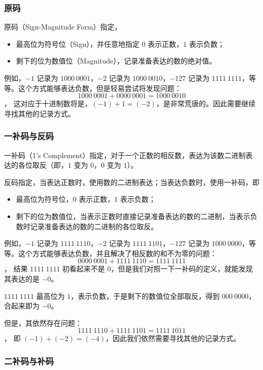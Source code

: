         \subsubsection{原码}\label{subsubsec:ArithBasics/positional-notation-presentation/binary/sign-magnitude}
            原码（Sign-Magnitude Form）指定，
            \begin{itemize}
                \item 最高位为符号位（Sign），并任意地指定 $0$ 表示正数，$1$ 表示负数；
                \item 剩下的位为数值位（Magnitude），记录准备表达的数的绝对值。
            \end{itemize}

            例如，$-1$ 记录为 $1000\ 0001$，$-2$ 记录为 $1000\ 0010$，$-127$ 记录为 $1111\ 1111$，等等。这个方式能够表达负数，但是轻易尝试将发现问题：
            \[1000\ 0001 + 0000\ 0001 = 1000\ 0010\]，
            这对应于十进制数将是，$(-1) + 1 = (-2)$，是非常荒唐的。因此需要继续寻找其他的记录方式。

        \subsubsection{一补码与反码}\label{subsubsec:ArithBasics/positional-notation-presentation/binary/one-complement}
            一补码（1's Complement）指定，对于一个正数的相反数，表达为该数二进制表达的各位取反（即，$1$ 变为 $0$，$0$ 变为 $1$）。

            反码指定，当表达正数时，使用数的二进制表达；当表达负数时，使用一补码，即
            \begin{itemize}
                \item 最高位为符号位，$0$ 表示正数，$1$ 表示负数；
                \item 剩下的位为数值位，当表示正数时直接记录准备表达的数的二进制，当表示负数时记录准备表达的数的二进制的各位取反。
            \end{itemize}

            例如，$-1$ 记录为 $1111\ 1110$，$-2$ 记录为 $1111\ 1101$，$-127$ 记录为 $1000\ 0000$，等等。这个方式能够表达负数，并且解决了相反数的和不为零的问题：
            \[0000\ 0001 + 1111\ 1110 = 1111\ 1111\]，
            结果 $1111\ 1111$ 初看起来不是 $0$，但是我们对照一下一补码的定义，就能发现其表达的是 $-0$。
            \begin{displayquote}
                $1111\ 1111$ 最高位为 $1$，表示负数，于是剩下的数值位全部取反，得到 $000\ 0000$，合起来即为 $-0$。
            \end{displayquote}
            但是，其依然存在问题：
            \[1111\ 1110 + 1111\ 1101 = 1111\ 1011\]，
            即 $(-1) + (-2) = (-4)$，因此我们依然需要寻找其他的记录方式。

        \subsubsection{二补码与补码}\label{subsubsec:ArithBasics/positional-notation-presentation/binary/two-complement}
